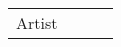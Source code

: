 \begin{tabular}{llll}
Artist           &                                                                                                                                                                                                                                                                                                                                                                                                                                                                                                                                                                                                                                                                                                                                                                                                                                                                                                                                                                                                                                                                            &                                                                                                                                                                                                                                                                                                                                                                                                                                                                                                                                                                                                                                                                                                                                                                                                                                                                                                                                                                                                                                                                            &                                                                                                                                                                                                                                                                                                                                                                                                                                                                                                                                                                                                                                                                                                                                                                                                                                                                                                                                                                                                                                                                             \\

\end{tabular}
